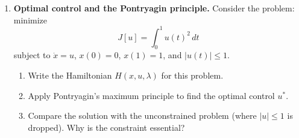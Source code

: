 \begin{enumerate}
    \item[$\star$] \textbf{Optimal control and the Pontryagin principle.}
    Consider the problem: minimize
    \[
        J[u] = \int_0^1 u(t)^2 \, dt
    \]
    subject to $\dot{x} = u$, $x(0) = 0$, $x(1) = 1$, and $|u(t)| \leq 1$.
    \begin{enumerate}
        \item Write the Hamiltonian $H(x, u, \lambda)$ for this problem.
        \item Apply Pontryagin's maximum principle to find the optimal control $u^*$.
        \item Compare the solution with the unconstrained problem (where $|u| \leq 1$ is dropped). Why is the constraint essential?
    \end{enumerate}

\end{enumerate}
